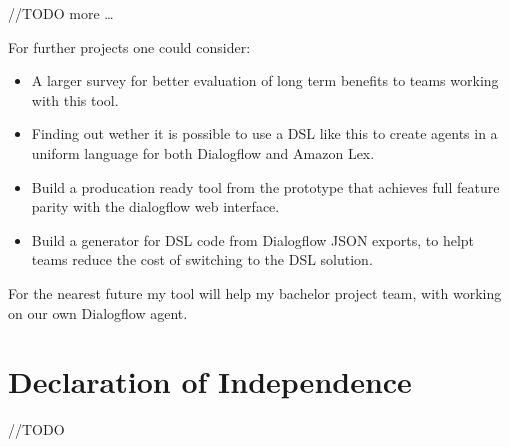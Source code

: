 //TODO more
\dots


For further projects one could consider:
\begin{itemize}
    \item A larger survey for better evaluation of long term benefits to teams working with this tool.
    \item Finding out wether it is possible to use a DSL like this to create agents in a uniform language for both Dialogflow and Amazon Lex.
    \item Build a producation ready tool from the prototype that achieves full feature parity with the dialogflow web interface.
    \item Build a generator for DSL code from Dialogflow JSON exports, to helpt teams reduce the cost of switching to the DSL solution.
\end{itemize}

For the nearest future my tool will help my bachelor project team, with working on our own Dialogflow agent.


\chapter{Declaration of Independence}
//TODO
